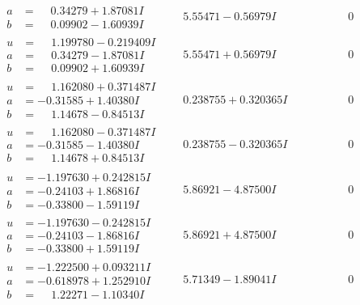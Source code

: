\documentclass[1p]{elsarticle_modified}
\theoremstyle{definition}
\begin{document}
$$\begin{array}{c|c|c}
\begin{aligned}
a &= \phantom{-}0.34279 + 1.87081 I \\
b &= \phantom{-}0.09902 - 1.60939 I\end{aligned}
 & \phantom{-}5.55471 - 0.56979 I & \phantom{-0.000000 } 0 \\ \hline\begin{aligned}
u &= \phantom{-}1.199780 - 0.219409 I \\
a &= \phantom{-}0.34279 - 1.87081 I \\
b &= \phantom{-}0.09902 + 1.60939 I\end{aligned}
 & \phantom{-}5.55471 + 0.56979 I & \phantom{-0.000000 } 0 \\ \hline\begin{aligned}
u &= \phantom{-}1.162080 + 0.371487 I \\
a &= -0.31585 + 1.40380 I \\
b &= \phantom{-}1.14678 - 0.84513 I\end{aligned}
 & \phantom{-}0.238755 + 0.320365 I & \phantom{-0.000000 } 0 \\ \hline\begin{aligned}
u &= \phantom{-}1.162080 - 0.371487 I \\
a &= -0.31585 - 1.40380 I \\
b &= \phantom{-}1.14678 + 0.84513 I\end{aligned}
 & \phantom{-}0.238755 - 0.320365 I & \phantom{-0.000000 } 0 \\ \hline\begin{aligned}
u &= -1.197630 + 0.242815 I \\
a &= -0.24103 + 1.86816 I \\
b &= -0.33800 - 1.59119 I\end{aligned}
 & \phantom{-}5.86921 - 4.87500 I & \phantom{-0.000000 } 0 \\ \hline\begin{aligned}
u &= -1.197630 - 0.242815 I \\
a &= -0.24103 - 1.86816 I \\
b &= -0.33800 + 1.59119 I\end{aligned}
 & \phantom{-}5.86921 + 4.87500 I & \phantom{-0.000000 } 0 \\ \hline\begin{aligned}
u &= -1.222500 + 0.093211 I \\
a &= -0.618978 + 1.252910 I \\
b &= \phantom{-}1.22271 - 1.10340 I\end{aligned}
 & \phantom{-}5.71349 - 1.89041 I & \phantom{-0.000000 } 0 \\ \hline\begin{aligned}

\end{aligned}
\end{array}$$
\end{document}
